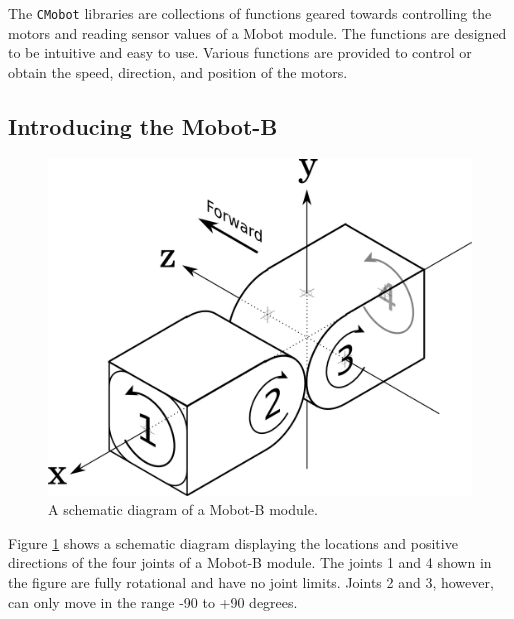 \documentclass{article}
\begin{document}
The \texttt{CMobot} libraries are collections of functions geared towards
controlling the motors and reading sensor values of a Mobot module. The
functions are designed to be intuitive
and easy to use. Various functions are provided to control or obtain the speed,
direction, and position of the motors.

\subsection{Introducing the Mobot-B}

\begin{figure}[H]
\begin{center}
\includegraphics[width=4.5in]{images/joint_diagram_verbose.png}
\end{center}
\caption{\label{fig:joint_diagram_verbose.png} A schematic diagram of a Mobot-B module.}
\end{figure}

Figure \ref{fig:joint_diagram_verbose.png} shows a schematic diagram displaying the
locations and positive directions of the four joints of a Mobot-B module. The
joints 1 and 4 shown in the figure are fully rotational and have no joint limits.
Joints 2 and 3, however, can only move in the range -90 to +90 degrees.
\end{document}
